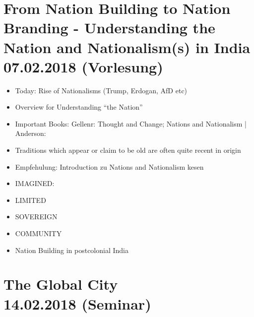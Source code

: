 \documentclass[emulatestandardclasses]{scrartcl}
\begin{document}
\section{From Nation Building to Nation Branding - Understanding the Nation and Nationalism(s) in India\\07.02.2018 (Vorlesung)}

\begin{itemize}
  \item Today: Rise of Nationalisms (Trump, Erdogan, AfD etc)
  \item Overview for Understanding "`the Nation"'
  \item Important Books: Gellenr: Thought and Change; Nations and Nationalism | Anderson: 
  \item Traditions which appear or claim to be old are often quite recent in origin
  \item Empfehulung: Introduction zu Nations and Nationalism kesen
  \item IMAGINED: 
  \item LIMITED
  \item SOVEREIGN
  \item COMMUNITY
  \item Nation Building in postcolonial India
\end{itemize}


\section{The Global City\\14.02.2018 (Seminar)}
\end{document}
